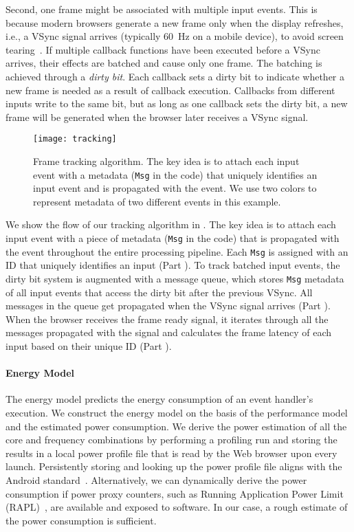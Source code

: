 Second, one frame might be associated with multiple input events. This is because modern browsers generate a new frame only when the display refreshes, i.e., a VSync signal arrives (typically 60~Hz on a mobile device), to avoid screen tearing~\cite{jankbusting,vsync}. If multiple callback functions have been executed before a VSync arrives, their effects are batched and cause only one frame. The batching is achieved through a \textit{dirty bit}. Each callback sets a dirty bit to indicate whether a new frame is needed as a result of callback execution. Callbacks from different inputs write to the same bit, but as long as one callback sets the dirty bit, a new frame will be generated when the browser later receives a VSync signal.

\begin{figure}[t]
  \centering
  \texttt{[image: tracking]}
  \caption{Frame tracking algorithm. The key idea is to attach each input event with a metadata (\texttt{Msg} in the code) that uniquely identifies an input event and is propagated with the event. We use two colors to represent metadata of two different events in this example.}
  \label{fig:tracking}
\end{figure}

We show the flow of our tracking algorithm in . The key idea is to attach each input event with a piece of metadata (\texttt{Msg} in the code) that is propagated with the event throughout the entire processing pipeline. Each \texttt{Msg} is assigned with an ID that uniquely identifies an input (Part ). To track batched input events, the dirty bit system is augmented with a message queue, which stores \texttt{Msg} metadata of all input events that access the dirty bit after the previous VSync. All messages in the queue get propagated when the VSync signal arrives (Part ). When the browser receives the frame ready signal, it iterates through all the messages propagated with the signal and calculates the frame latency of each input based on their unique ID (Part ).

\paragraph{Energy Model} The energy model predicts the energy consumption of an event handler's execution. We construct the energy model on the basis of the performance model and the estimated power consumption. We derive the power estimation of all the core and frequency combinations by performing a profiling run and storing the results in a local power profile file that is read by the Web browser upon every launch. Persistently storing and looking up the power profile file aligns with the Android standard~\cite{powerxml}. Alternatively, we can dynamically derive the power consumption if power proxy counters, such as Running Application Power Limit (RAPL)~\cite{rapl}, are available and exposed to software. In our case, a rough estimate of the power consumption is sufficient.

